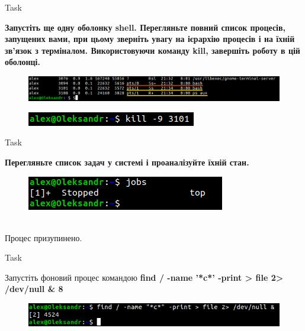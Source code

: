 \documentclass[a4paper,12pt]{article}
\newcommand{\RomanNumeralCaps}[1]{\MakeUppercase{\romannumeral #1}}
\begin{document}
\newpage
    \begin{center}
        \Large{Task \RomanNumeralCaps{3}}
    \end{center}
    \textbf{Запустіть ще одну оболонку shell. Перегляньте повний список процесів, запущених вами, при цьому зверніть
    увагу на ієрархію процесів і на їхній зв'язок з терміналом. Використовуючи команду kill, завершіть роботу в цій оболонці.}
    \begin{figure}[h!]
        \begin{minipage}[h]{1\linewidth}
            \centering
            \includegraphics[width=0.8\linewidth]{Prt sc/Figure_3_1.png}  
        \end{minipage}
    \end{figure}
    \begin{figure}[h!]
        \begin{minipage}[h]{1\linewidth}
            \centering
            \includegraphics[width=0.6\linewidth]{Prt sc/Figure_3_2.png}  
        \end{minipage}
    \end{figure}
    \begin{center}
        \Large{Task \RomanNumeralCaps{4}}
    \end{center}
    \textbf{Перегляньте список задач у системі і проаналізуйте їхній стан.}
    \begin{figure}[h!]
        \begin{minipage}[h]{1\linewidth}
            \centering
            \includegraphics[width=0.6\linewidth]{Prt sc/Figure_4.png}  
        \end{minipage}
    \end{figure} \\
    Процес призупинено.
    \begin{center}
        \Large{Task \RomanNumeralCaps{5}}
    \end{center}
    Запустіть фоновий процес командою
    \textbf{find / -name '*c*' -print > file 2> /dev/null \& 8}
    \begin{figure}[h!]
        \begin{minipage}[h]{1\linewidth}
            \centering
            \includegraphics[width=0.6\linewidth]{Prt sc/Figure_5.png}  
        \end{minipage}
    \end{figure}
\end{document}
